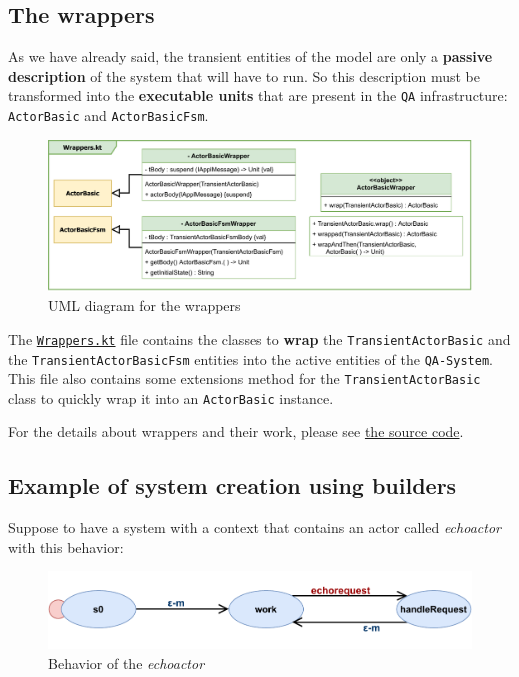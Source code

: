 \subsection{The wrappers}

As we have already said, the transient entities of the model are only a \textbf{passive description} of the system that will have to run. So this description must be transformed into the \textbf{executable units} that are present in the \texttt{QA} infrastructure: \texttt{ActorBasic} and \texttt{ActorBasicFsm}.

\begin{figure}[h!]
	\centering
	\includegraphics[width=\textwidth]{img/[UML]it.unibo.kaktor.builders_wrapper}
	\caption{UML diagram for the wrappers}
	\label{fig::builders_wrapper}
\end{figure}

The \href{https://github.com/LM-96/QA-Extensions/blob/main/it.unibo.qakactor/src/main/kotlin/builders/Wrappers.kt}{\texttt{Wrappers.kt}} file contains the classes to \textbf{wrap} the \texttt{TransientActorBasic} and the \texttt{TransientActorBasicFsm} entities into the active entities of the \texttt{QA-System}.
This file also contains some extensions method for the \texttt{TransientActorBasic} class to quickly wrap it into an \texttt{ActorBasic} instance.

For the details about wrappers and their work, please see \href{https://github.com/LM-96/QA-Extensions/blob/main/it.unibo.qakactor/src/main/kotlin/builders/Wrappers.kt}{the source code}.

\subsection{Example of system creation using builders}

Suppose to have a system with a context that contains an actor called \textit{echoactor} with this behavior:
\begin{figure}[h!]
	\centering
	\includegraphics[width=\textwidth]{img/[EG]simple_echo_actor_diagram}
	\caption{Behavior of the \textit{echoactor}}
	\label{fig::echo_actor_example}
\end{figure}

